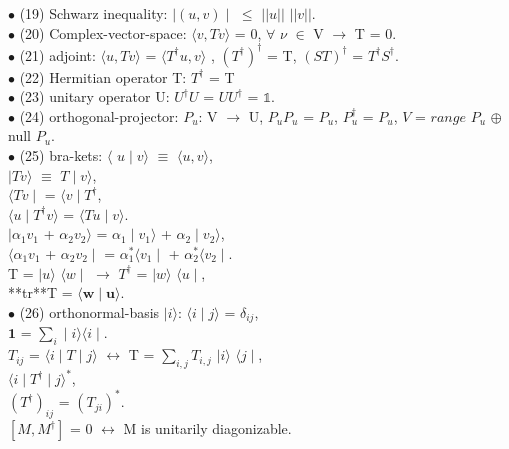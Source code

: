 \documentclass[10pt,fancy]{elegantbook}
\begin{document}
{$\bullet$ (19) Schwarz inequality: $\mid(u,v)\mid$ $\leq$ $ ||u ||$ $|| v ||$.  \\

$\bullet$ (20) Complex-vector-space: $\langle v,Tv \rangle$ = 0, $\forall$ $\nu$ $\in$ V $\longrightarrow$ T = 0.  \\

$\bullet$ (21) adjoint: $\langle{u,Tv} \rangle$ = $\langle T^\dagger{u,v} \rangle$ , $(T^\dagger)^\dagger$ = T, $(ST)^\dagger$ = $T^\dagger S^\dagger$. \\

$\bullet$ (22) Hermitian operator T: $T^\dagger$ = T \\ 

$\bullet$ (23) unitary operator U: $U^\dagger U$ = $UU^\dagger$ = $\mathbb1$.  \\

$\bullet$ (24) orthogonal-projector: $P_u$: V $\longrightarrow$ U,  
${P_uP_u}$ = $P_u$,  
$P_u^\dagger$ = $P_u$,  
$ V $ = $ range $ $P_u$ $\oplus$ null $P_u$. \\

$\bullet$ (25) bra-kets: $\langle$ $u \mid v \rangle$ $\equiv$ $\langle { u,v} \rangle$,  \\ 
$\mid Tv \rangle$ $\equiv$ $T \mid v \rangle$,  \\
$\langle Tv \mid$ = $\langle v \mid T^\dagger$, \\
$\langle u \mid T^\dagger v \rangle$ = $\langle Tu \mid v \rangle$. \\ 
$\mid \alpha_1 v_1$ + $\alpha_2 v_2 \rangle$ = $\alpha_1 \mid v_1 \rangle$ + $\alpha_2 \mid v_2 \rangle$,  \\ 
$\langle \alpha_1 v_1$ + $\alpha_2 v_2 \mid$ = $\alpha_1^* \langle v_1 \mid $ + $\alpha_2^* \langle v_2 \mid $.  \\  
T = $\mid u \rangle$ $\langle w \mid$ $\longrightarrow$ $T^\dagger$ = $\mid w \rangle$ $\langle u \mid$, \\ 
**tr**T  = $\langle \mathbf w \mid \mathbf u \rangle$.  \\

$\bullet$ (26) orthonormal-basis $|i\rangle$: $\langle i\mid j \rangle$ = $\delta_{ij}$,  \\
$\mathbf 1$  = $\sum_i \mid i \rangle \langle i \mid$.  \\  
$T_{ij}$ = $\langle i\mid T \mid j \rangle$ $\longleftrightarrow$ T = $\sum_{i,j} T_{i,j}$ $\mid i \rangle$ $\langle j \mid$,  \\
$\langle i \mid T^\dagger \mid j \rangle^*$,  \\ 
$(T^\dagger)_{ij}$ = $(T_{ji})^*$.  \\  
$[M,M^\dagger]$ = 0 $\longleftrightarrow$ M is unitarily diagonizable.  \\

}
\end{document}
